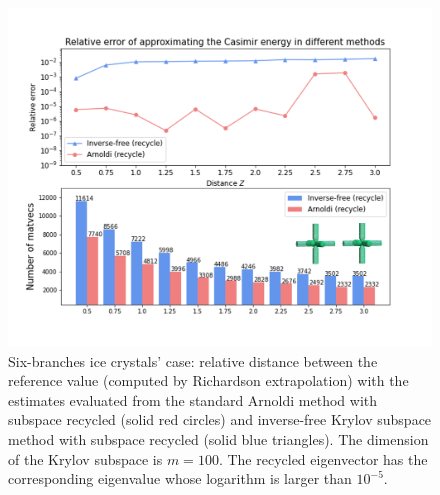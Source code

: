         \begin{figure}[H]
                \centering
                \includegraphics[width = \textwidth]{figures/6branches_rel_err.png}
                \caption{Six-branches ice crystals' case: relative distance between the reference value (computed by Richardson extrapolation) with the estimates evaluated from the standard Arnoldi 
                method with subspace recycled (solid red circles) and inverse-free Krylov subspace method with subspace recycled (solid blue triangles). The dimension of the Krylov subspace is $m = 100$.
                The recycled eigenvector has the corresponding eigenvalue whose logarithm is larger than $10^{-5}$.}       
             \end{figure}
